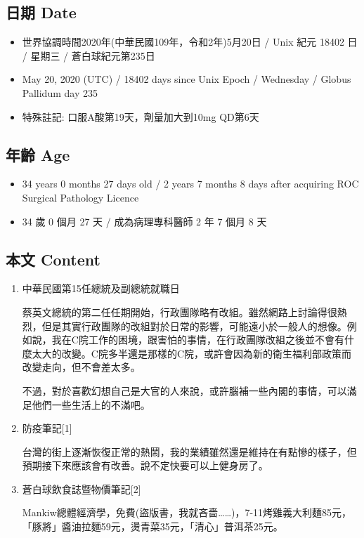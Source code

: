 \documentclass[a5paper, 11pt
]{book}
\providecommand{\tightlist}{%
  \setlength{\itemsep}{0pt}\setlength{\parskip}{0pt}}
\begin{document}
\hypertarget{ux65e5ux671f-date-80}{%
\subsection{日期 Date}\label{ux65e5ux671f-date-80}}

\begin{itemize}
\tightlist
\item
  世界協調時間2020年(中華民國109年，令和2年)5月20日 / Unix 紀元 18402 日
  / 星期三 / 蒼白球紀元第235日
\item
  May 20, 2020 (UTC) / 18402 days since Unix Epoch / Wednesday / Globus
  Pallidum day 235
\item
  特殊註記: 口服A酸第19天，劑量加大到10mg QD第6天
\end{itemize}

\hypertarget{ux5e74ux9f61-age-80}{%
\subsection{年齡 Age}\label{ux5e74ux9f61-age-80}}

\begin{itemize}
\tightlist
\item
  34 years 0 months 27 days old / 2 years 7 months 8 days after
  acquiring ROC Surgical Pathology Licence
\item
  34 歲 0 個月 27 天 / 成為病理專科醫師 2 年 7 個月 8 天
\end{itemize}

\hypertarget{ux672cux6587-content-80}{%
\subsection{本文 Content}\label{ux672cux6587-content-80}}

\begin{enumerate}
\def\labelenumi{\arabic{enumi}.}
\item
  中華民國第15任總統及副總統就職日

  蔡英文總統的第二任任期開始，行政團隊略有改組。雖然網路上討論得很熱烈，但是其實行政團隊的改組對於日常的影響，可能遠小於一般人的想像。例如說，我在C院工作的困境，跟害怕的事情，在行政團隊改組之後並不會有什麼太大的改變。C院多半還是那樣的C院，或許會因為新的衛生福利部政策而改變走向，但不會差太多。

  不過，對於喜歡幻想自己是大官的人來說，或許腦補一些內閣的事情，可以滿足他們一些生活上的不滿吧。
\item
  防疫筆記{[}1{]}

  台灣的街上逐漸恢復正常的熱鬧，我的業績雖然還是維持在有點慘的樣子，但預期接下來應該會有改善。說不定快要可以上健身房了。
\item
  蒼白球飲食誌暨物價筆記{[}2{]}

  Mankiw總體經濟學，免費(盜版書，我就吝嗇\ldots\ldots)，7-11烤雞義大利麵85元，「豚將」醬油拉麵59元，燙青菜35元，「清心」普洱茶25元。
\end{enumerate}
\end{document}
